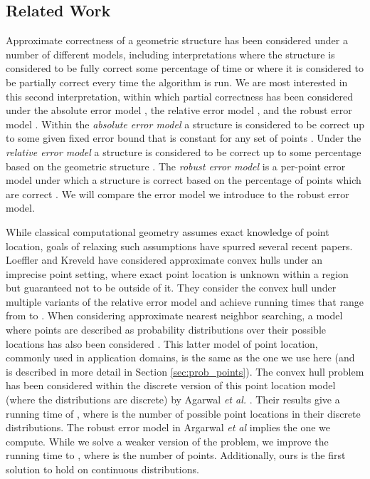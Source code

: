 \documentclass[11pt]{article}
\begin{document}
\subsection{Related Work}

Approximate correctness of a geometric structure has been considered under a number of different models, including interpretations where the structure is considered to be fully correct some percentage of time or where it is considered to be partially correct every time the algorithm is run.  We are most interested in this second interpretation, within which partial correctness has been considered under the absolute error model \cite{Fonseca10Approximate}, the relative error model \cite{Arya00Approximate}, and the robust error model \cite{Rousseeuw05Robust}.
Within the \emph{absolute error model} a structure is considered to be correct up to some given fixed error bound  that is constant for any set of points \cite{Fonseca10Approximate}.   
Under the \emph{relative error model} a structure is considered to be correct up to some percentage based on the geometric structure \cite{Arya00Approximate}.
The \emph{robust error model} is a per-point error model under which a structure is correct based on the percentage of points which are correct \cite{Rousseeuw05Robust}.  We will compare the error model we introduce to the robust error model. 

While classical computational geometry assumes exact knowledge of point location, goals of relaxing such assumptions have spurred several recent papers.
Loeffler and Kreveld \cite{Loeffler10Imprecise} have considered approximate convex hulls under an imprecise point setting, where exact point location is unknown within a region but guaranteed not to be outside of it.  They consider the convex hull under multiple variants of the relative error model and achieve running times that range from  to .
When considering approximate nearest neighbor searching, a model where points are described as probability distributions over their possible locations has also been considered \cite{Agarwal13ANN}.  This latter model of point location, commonly used in application domains, is the same as the one we use here (and is described in more detail in Section \ref{sec:prob_points}).  The convex hull problem has been considered within the discrete version of this point location model (where the distributions are discrete) by Agarwal \textit{et al.} \cite{Agarwal14ConvexHulls}.  
Their results give a running time of , where  is the number of possible point locations in their discrete distributions.  The robust error model in Argarwal \textit{et al} implies the one we compute.  While we solve a weaker version of the problem, we improve the running time to , where  is the number of points.  Additionally, ours is the first solution to hold on continuous distributions.  
\end{document}
